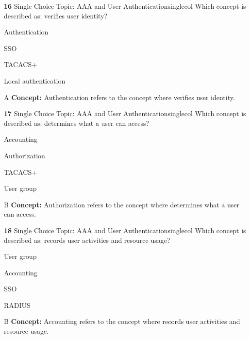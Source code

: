 \documentclass[10pt,a4paper]{article}
\begin{document}
\begin{qcard}{\color{white}\textbf{16} \hfill \small Single Choice \textbar{} Topic: AAA and User Authentication}{singlecol}
Which concept is described as: verifies user identity?

\begin{qoptions}
\item Authentication
\item SSO
\item TACACS+
\item Local authentication
\end{qoptions}
\begin{explainbox}{A}
\textbf{Concept:} Authentication refers to the concept where verifies user identity.
\end{explainbox}
\end{qcard}

\begin{qcard}{\color{white}\textbf{17} \hfill \small Single Choice \textbar{} Topic: AAA and User Authentication}{singlecol}
Which concept is described as: determines what a user can access?

\begin{qoptions}
\item Accounting
\item Authorization
\item TACACS+
\item User group
\end{qoptions}
\begin{explainbox}{B}
\textbf{Concept:} Authorization refers to the concept where determines what a user can access.
\end{explainbox}
\end{qcard}

\begin{qcard}{\color{white}\textbf{18} \hfill \small Single Choice \textbar{} Topic: AAA and User Authentication}{singlecol}
Which concept is described as: records user activities and resource usage?

\begin{qoptions}
\item User group
\item Accounting
\item SSO
\item RADIUS
\end{qoptions}
\begin{explainbox}{B}
\textbf{Concept:} Accounting refers to the concept where records user activities and resource usage.
\end{explainbox}
\end{qcard}
\end{document}
